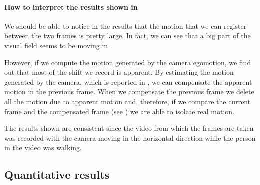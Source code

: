 

\paragraph{How to interpret the results shown in } We should be able to notice in the results that the motion that we can register between the two frames is pretty large. In fact, we can see that a big part of the visual field seems to be moving in .

However, if we compute the motion generated by the camera egomotion, we find out that most of the shift we record is apparent.
By estimating the motion generated by the camera, which is reported in  , we can compensate the apparent motion in the previous frame.
When we compensate the previous frame we delete all the motion due to apparent motion and, therefore, if we compare the current frame and the compensated frame (see ) we are able to isolate real motion.

The results shown are consistent since the video from which the frames are taken was recorded with the camera moving in the horizontal direction while the person in the video was walking.

\subsection{Quantitative results}

